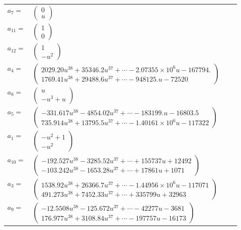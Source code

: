 \documentclass[1p]{elsarticle_modified}
\theoremstyle{definition}
\begin{document}
\begin{tabular}{m{7pt} m{180pt} m{7pt} m{180pt} }
\flushright $a_{7}=$&$\begin{pmatrix}0\\u\end{pmatrix}$ \\
\flushright $a_{11}=$&$\begin{pmatrix}1\\0\end{pmatrix}$ \\
\flushright $a_{12}=$&$\begin{pmatrix}1\\- u^2\end{pmatrix}$ \\
\flushright $a_{4}=$&$\begin{pmatrix}2029.20 u^{38}+35346.2 u^{37}+\cdots-2.07355\times10^{6} u-167794.\\1769.41 u^{38}+29488.6 u^{37}+\cdots-948125. u-72520\end{pmatrix}$ \\
\flushright $a_{8}=$&$\begin{pmatrix}u\\- u^3+u\end{pmatrix}$ \\
\flushright $a_{5}=$&$\begin{pmatrix}-331.617 u^{38}-4854.02 u^{37}+\cdots-183199. u-16803.5\\735.914 u^{38}+13795.5 u^{37}+\cdots-1.40161\times10^{6} u-117322\end{pmatrix}$ \\
\flushright $a_{1}=$&$\begin{pmatrix}- u^2+1\\- u^2\end{pmatrix}$ \\
\flushright $a_{10}=$&$\begin{pmatrix}-192.527 u^{38}-3285.52 u^{37}+\cdots+155737 u+12492\\-103.242 u^{38}-1653.28 u^{37}+\cdots+17861 u+1071\end{pmatrix}$ \\
\flushright $a_{3}=$&$\begin{pmatrix}1538.92 u^{38}+26366.7 u^{37}+\cdots-1.44956\times10^{6} u-117071\\491.273 u^{38}+7452.33 u^{37}+\cdots+335799 u+32963\end{pmatrix}$ \\
\flushright $a_{9}=$&$\begin{pmatrix}-12.5508 u^{38}-125.672 u^{37}+\cdots-42277 u-3681\\176.977 u^{38}+3108.84 u^{37}+\cdots-197757 u-16173\end{pmatrix}$ \\

\end{tabular}
\end{document}
